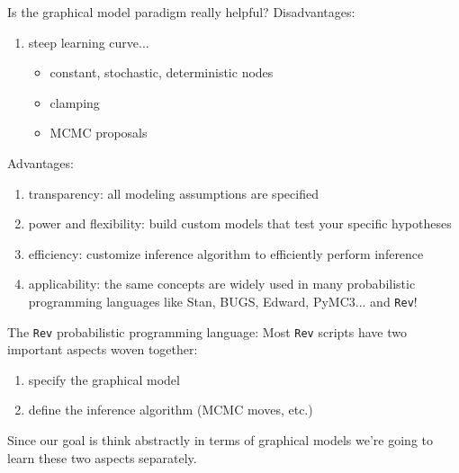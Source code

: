 \documentclass[mathserif]{beamer}
\begin{document}
\begin{frame}
    \begin{block}{Is the graphical model paradigm really helpful?}
    \bigskip
    \small
    Disadvantages: 
    \begin{enumerate}
        \item steep learning curve...
        \begin{itemize}
            \item constant, stochastic, deterministic nodes
            \item clamping
            \item MCMC proposals
        \end{itemize}
    \end{enumerate}
    Advantages: 
    \begin{enumerate}
        \item transparency: all modeling assumptions are specified
        \item power and flexibility: build custom models that test your specific hypotheses 
        \item efficiency: customize inference algorithm to efficiently perform inference 
        \item applicability: the same concepts are widely used in many probabilistic programming languages like Stan, BUGS, Edward, PyMC3... and \texttt{Rev}!
    \end{enumerate}
    \end{block}
\end{frame}


\begin{frame}

    \small
    \begin{block}{The \texttt{Rev} probabilistic programming language:}
    \bigskip
    Most \texttt{Rev} scripts have two important aspects woven together: 
    \begin{enumerate}
        \item specify the graphical model
        \item define the inference algorithm (MCMC moves, etc.)
    \end{enumerate}
    Since our goal is think abstractly in terms of graphical models
     we're going to learn these two aspects separately.
    \end{block}
\end{frame}



\end{document}
